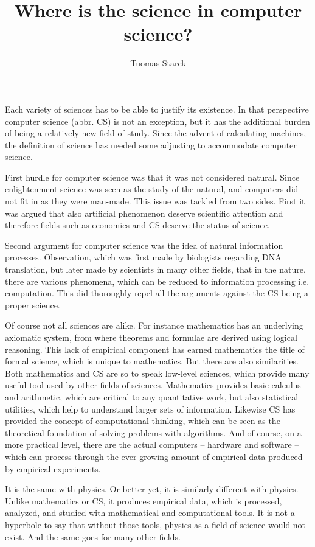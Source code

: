 \documentclass[a4paper,12pt]{article}
\begin{document}
\title{Where is the science in computer science?}
\author{Tuomas Starck}
\maketitle

Each variety of sciences has to be able to justify its existence. In that perspective computer science (abbr. CS) is not an exception, but it has the additional burden of being a relatively new field of study. Since the advent of calculating machines, the definition of science has needed some adjusting to accommodate computer science.

First hurdle for computer science was that it was not considered natural. Since enlightenment science was seen as the study of the natural, and computers did not fit in as they were man-made. This issue was tackled from two sides. First it was argued that also artificial phenomenon deserve scientific attention and therefore fields such as economics and CS deserve the status of science.

Second argument for computer science was the idea of natural information processes. Observation, which was first made by biologists regarding DNA translation, but later made by scientists in many other fields, that in the nature, there are various phenomena, which can be reduced to information processing i.e. computation. This did thoroughly repel all the arguments against the CS being a proper science.

Of course not all sciences are alike. For instance mathematics has an underlying axiomatic system, from where theorems and formulae are derived using logical reasoning. This lack of empirical component has earned mathematics the title of formal science, which is unique to mathematics. But there are also similarities. Both mathematics and CS are so to speak low-level sciences, which provide many useful tool used by other fields of sciences. Mathematics provides basic calculus and arithmetic, which are critical to any quantitative work, but also statistical utilities, which help to understand larger sets of information. Likewise CS has provided the concept of computational thinking, which can be seen as the theoretical foundation of solving problems with algorithms. And of course, on a more practical level, there are the actual computers -- hardware and software -- which can process through the ever growing amount of empirical data produced by empirical experiments.

It is the same with physics. Or better yet, it is similarly different with physics. Unlike mathematics or CS, it produces empirical data, which is processed, analyzed, and studied with mathematical and computational tools. It is not a hyperbole to say that without those tools, physics as a field of science would not exist. And the same goes for many other fields.
\end{document}
